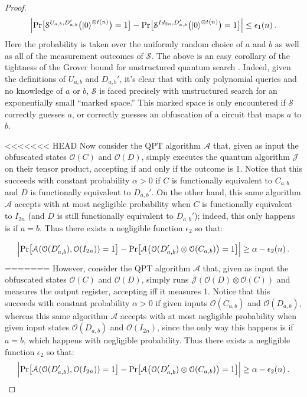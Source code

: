 \documentclass[11pt]{article}
\numberwithin{equation}{section}
\newcommand{\algo}{\mathcal}
\begin{document}
{\begin{proof}
\begin{equation}\label{eqn11}
\Bigl| \text{Pr}\bigl[\mathcal S^{U_{a,b}, D_{a,b}'}\bigl({\left\vert{0}\right\rangle}^{\otimes t(n)}\bigr) = 1\bigr]
- \text{Pr}\bigl[\mathcal S^{Id_{2n}, D_{a,b}'}\bigl({\left\vert{0}\right\rangle}^{\otimes t(n)}\bigr) = 1\bigr] \Bigr| 
\leq \epsilon_1(n)\,.
\end{equation}
Here the probability is taken over the uniformly random choice of $a$ and $b$ as well as all of the measurement outcomes of $\algo S$. The above is an easy corollary of the tightness of the Grover bound for unstructured quantum search \cite{BBBV}. Indeed, given the definitions of $U_{a, b}$ and $D_{a, b}'$, it's clear that with only polynomial queries and no knowledge of $a$ or $b$, $\algo S$ is faced precisely with unstructured search for an exponentially small ``marked space.'' This marked space is only encountered if $\algo S$ correctly guesses $a$, or correctly guesses an obfuscation of a circuit that maps $a$ to $b$.
  
<<<<<<< HEAD
Now consider the QPT algorithm $\mathcal{A}$ that, given as input the obfuscated states $\mathcal{O}(C)$ and $\mathcal{O}(D)$, simply executes the quantum algorithm $\mathcal{J}$ on their tensor product, accepting if and only if the outcome is $1$. Notice that this succeeds with constant probability $\alpha > 0$ if $C$ is functionally equivalent to $C_{a,b}$ and $D$ is functionally equivalent to $D_{a,b}'$. On the other hand, this same algorithm $\algo A$ accepts with at most negligible probability when $C$ is functionally equivalent to $I_{2n}$ (and $D$ is still functionally equivalent to $D_{a, b}'$); indeed, this only happens is if $a = b$. Thus there exists a negligible function $\epsilon_2$ so that:

\begin{equation}\label{eqn2}
\Bigl| \text{Pr}\bigl[\mathcal A(\mathcal{O}(D'_{a,b}),\mathcal{O}(I_{2n})) = 1\bigr]
- \text{Pr}\bigl[\mathcal A\bigl(\mathcal{O}(D'_{a,b})\otimes\mathcal{O}(C_{a,b})\bigr) = 1\bigr] \Bigr| 
\geq \alpha-\epsilon_2(n)\,.
\end{equation}
=======
However, consider the QPT algorithm $\mathcal{A}$ that, given as input the obfuscated states $\mathcal{O}(C)$ and $\mathcal{O}(D)$, simply runs $\mathcal{J}(\mathcal{O}(D)\otimes\mathcal{O}(C))$ and measures the output register, accepting iff it measures 1.  Notice that this succeeds with constant probability $\alpha>0$ if given inputs $\mathcal{O}(C_{a,b})$ and $\mathcal{O}(D_{a,b})$, whereas this same algorithm $\algo A$ accepts with at most negligible probability when given input states $\mathcal{O}(D_{a,b})$ and $\mathcal{O}(I_{2n})$, since the only way this happens is if $a=b$, which happens with negligible probability.  
Thus there exists a negligible function $\epsilon_2$ so that:
\begin{equation}\label{eqn2}\Bigl| \text{Pr}\bigl[\mathcal A(\mathcal{O}(D'_{a,b}),\mathcal{O}(I_{2n})) = 1\bigr]- \text{Pr}\bigl[\mathcal A\bigl(\mathcal{O}(D'_{a,b})\otimes\mathcal{O}(C_{a,b})\bigr) = 1\bigr] \Bigr| \geq \alpha-\epsilon_2(n)\,.\end{equation}


\end{proof}}
\end{document}
